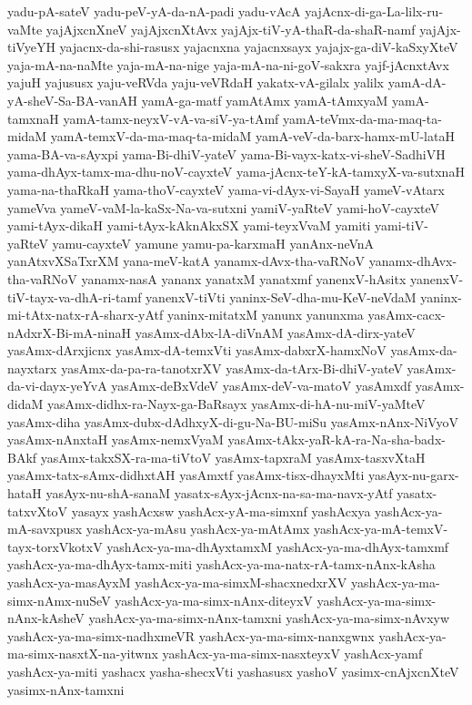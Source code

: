{yadu-pA-sateV
yadu-peV-yA-da-nA-padi
yadu-vAcA
yajAcnx-di-ga-La-lilx-ru-vaMte
yajAjxcnXneV
yajAjxcnXtAvx
yajAjx-tiV-yA-thaR-da-shaR-namf
yajAjx-tiVyeYH
yajacnx-da-shi-rasusx
yajacnxna
yajacnxsayx
yajajx-ga-diV-kaSxyXteV
yaja-mA-na-naMte
yaja-mA-na-nige
yaja-mA-na-ni-goV-sakxra
yajf-jAcnxtAvx
yajuH
yajususx
yaju-veRVda
yaju-veVRdaH
yakatx-vA-gilalx
yalilx
yamA-dA-yA-sheV-Sa-BA-vanAH
yamA-ga-matf
yamAtAmx
yamA-tAmxyaM
yamA-tamxnaH
yamA-tamx-neyxV-vA-va-siV-ya-tAmf
yamA-teVmx-da-ma-maq-ta-midaM
yamA-temxV-da-ma-maq-ta-midaM
yamA-veV-da-barx-hamx-mU-lataH
yama-BA-va-sAyxpi
yama-Bi-dhiV-yateV
yama-Bi-vayx-katx-vi-sheV-SadhiVH
yama-dhAyx-tamx-ma-dhu-noV-cayxteV
yama-jAcnx-teY-kA-tamxyX-va-sutxnaH
yama-na-thaRkaH
yama-thoV-cayxteV
yama-vi-dAyx-vi-SayaH
yameV-vAtarx
yameVva
yameV-vaM-la-kaSx-Na-va-sutxni
yamiV-yaRteV
yami-hoV-cayxteV
yami-tAyx-dikaH
yami-tAyx-kAknAkxSX
yami-teyxVvaM
yamiti
yami-tiV-yaRteV
yamu-cayxteV
yamune
yamu-pa-karxmaH
yanAnx-neVnA
yanAtxvXSaTxrXM
yana-meV-katA
yanamx-dAvx-tha-vaRNoV
yanamx-dhAvx-tha-vaRNoV
yanamx-nasA
yananx
yanatxM
yanatxmf
yanenxV-hAsitx
yanenxV-tiV-tayx-va-dhA-ri-tamf
yanenxV-tiVti
yaninx-SeV-dha-mu-KeV-neVdaM
yaninx-mi-tAtx-natx-rA-sharx-yAtf
yaninx-mitatxM
yanunx
yanunxma
yasAmx-cacx-nAdxrX-Bi-mA-ninaH
yasAmx-dAbx-lA-diVnAM
yasAmx-dA-dirx-yateV
yasAmx-dArxjicnx
yasAmx-dA-temxVti
yasAmx-dabxrX-hamxNoV
yasAmx-da-nayxtarx
yasAmx-da-pa-ra-tanotxrXV
yasAmx-da-tArx-Bi-dhiV-yateV
yasAmx-da-vi-dayx-yeYvA
yasAmx-deBxVdeV
yasAmx-deV-va-matoV
yasAmxdf
yasAmx-didaM
yasAmx-didhx-ra-Nayx-ga-BaRsayx
yasAmx-di-hA-nu-miV-yaMteV
yasAmx-diha
yasAmx-dubx-dAdhxyX-di-gu-Na-BU-miSu
yasAmx-nAnx-NiVyoV
yasAmx-nAnxtaH
yasAmx-nemxVyaM
yasAmx-tAkx-yaR-kA-ra-Na-sha-badx-BAkf
yasAmx-takxSX-ra-ma-tiVtoV
yasAmx-tapxraM
yasAmx-tasxvXtaH
yasAmx-tatx-sAmx-didhxtAH
yasAmxtf
yasAmx-tisx-dhayxMti
yasAyx-nu-garx-hataH
yasAyx-nu-shA-sanaM
yasatx-sAyx-jAcnx-na-sa-ma-navx-yAtf
yasatx-tatxvXtoV
yasayx
yashAcxsw
yashAcx-yA-ma-simxnf
yashAcxya
yashAcx-ya-mA-savxpusx
yashAcx-ya-mAsu
yashAcx-ya-mAtAmx
yashAcx-ya-mA-temxV-tayx-torxVkotxV
yashAcx-ya-ma-dhAyxtamxM
yashAcx-ya-ma-dhAyx-tamxmf
yashAcx-ya-ma-dhAyx-tamx-miti
yashAcx-ya-ma-natx-rA-tamx-nAnx-kAsha
yashAcx-ya-masAyxM
yashAcx-ya-ma-simxM-shacxnedxrXV
yashAcx-ya-ma-simx-nAmx-nuSeV
yashAcx-ya-ma-simx-nAnx-diteyxV
yashAcx-ya-ma-simx-nAnx-kAsheV
yashAcx-ya-ma-simx-nAnx-tamxni
yashAcx-ya-ma-simx-nAvxyw
yashAcx-ya-ma-simx-nadhxmeVR
yashAcx-ya-ma-simx-nanxgwnx
yashAcx-ya-ma-simx-nasxtX-na-yitwnx
yashAcx-ya-ma-simx-nasxteyxV
yashAcx-yamf
yashAcx-ya-miti
yashacx
yasha-shecxVti
yashasusx
yashoV
yasimx-cnAjxcnXteV
yasimx-nAnx-tamxni
}
